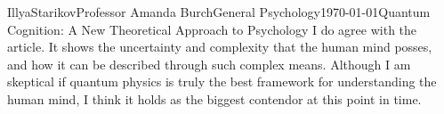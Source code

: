 \documentclass[12pt,letterpaper]{article}
\begin{document}
\begin{mla}{Illya}{Starikov}{Professor Amanda Burch}{General Psychology}{\today}{Quantum Cognition: A New Theoretical Approach to Psychology}
I do agree with the article. It shows the uncertainty and complexity that the human mind posses, and how it can be described through such complex means. Although I am skeptical if quantum physics is truly the best framework for understanding the human mind, I think it holds as the biggest contendor at this point in time.

\end{mla}
\end{document}
